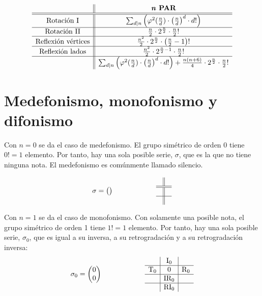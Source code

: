 		\[\begin{array}{c||c}
		&\textbf{\textit{n} PAR}\\\hline\hline
		\text{Rotación I}&\sum_{d|n}\left(\varphi^2(\frac{n}{d})\cdot\left(\frac{n}{d}\right)^d\cdot d!\right)\\\hline
		\text{Rotación II}&\frac{n}{2}\cdot2^{\frac{n}{2}}\cdot\frac{n}{2}!\\\hline
		\text{Reflexión vértices}&\frac{n^2}{2}\cdot2^{\frac{n}{2}}\cdot\left(\frac{n}{2}-1\right)!\\\hline
		\text{Reflexión lados}&\frac{n^2}{2}\cdot2^{\frac{n}{2}-1}\cdot\frac{n}{2}!\\\hline
		&\sum_{d|n}\left(\varphi^2(\frac{n}{d})\cdot\left(\frac{n}{d}\right)^d\cdot d!\right)+\frac{n(n+6)}{4}\cdot2^{\frac{n}{2}}\cdot\frac{n}{2}!\\
		\end{array}\]
		\def\arraystretch{1}
		
	\section{Medefonismo, monofonismo y difonismo}
	\label{monodi}
		Con $n=0$ se da el caso de medefonismo. El grupo simétrico de orden 0 tiene $0!=1$ elemento. Por tanto, hay una sola posible serie, $\sigma$, que es la que no tiene ninguna nota. El medefonismo es comúnmente llamado silencio.
		
		\[\sigma=\left(\begin{matrix}\\\end{matrix}\right)
		\qquad\qquad\qquad
		\begin{array}{l||r}
		&\\
		\hline
		\hline
		&\\
		\hline
		&
		\end{array}\]
	
		Con $n=1$ se da el caso de monofonismo. Con solamente una posible nota, el grupo simétrico de orden 1 tiene $1!=1$ elemento. Por tanto, hay una sola posible serie, $\sigma_0$, que es igual a su inversa, a su retrogradación y a su retrogradación inversa:
		\[\sigma_0=\left(\begin{matrix}0\\0\end{matrix}\right)
		\qquad\qquad\qquad
		\begin{array}{l|c|r}
			&\text{I}_{0}&\\
			\hline
			\text{T}_{0}&0&\text{R}_{0}\\
			\hline
			&\text{IR}_{0}&\\
			\hline
			&\text{RI}_{0}&
		\end{array}\]
	
